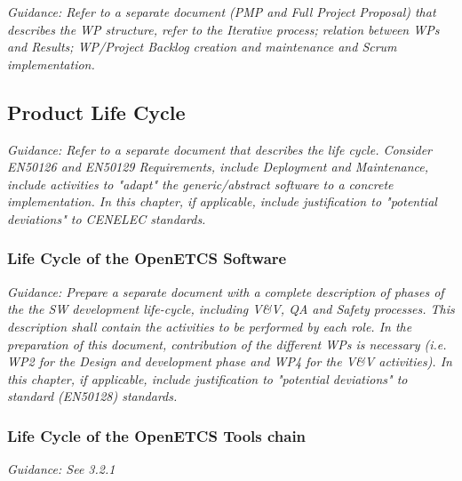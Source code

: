 \documentclass{template/openetcs_article}
\begin{document}

\textit{Guidance: Refer to a separate document (PMP and Full Project Proposal)  that describes the WP structure, refer to  the Iterative process; relation between WPs and Results; WP/Project Backlog creation and maintenance and Scrum implementation.}


\subsection{Product Life Cycle }


\textit{Guidance: Refer to a separate document that describes the life cycle. Consider EN50126 and EN50129 Requirements, include Deployment and Maintenance, include activities to "adapt" the generic/abstract software to a concrete implementation.
In this chapter, if applicable, include justification to "potential deviations" to CENELEC standards.}

\subsubsection{Life Cycle of the OpenETCS Software}
\textit{Guidance: Prepare a separate document with a complete description of phases of the the SW development life-cycle, including V\&V, QA and Safety processes. This description shall contain the activities to be performed by each role.
In the preparation of this document, contribution of the different WPs is necessary (i.e. WP2 for the Design and development phase and WP4 for the V\&V activities).
In this chapter, if applicable, include justification to "potential deviations" to standard (EN50128) standards.}


\subsubsection{Life Cycle of the OpenETCS Tools chain}
\textit{Guidance: See 3.2.1}

\end{document}
